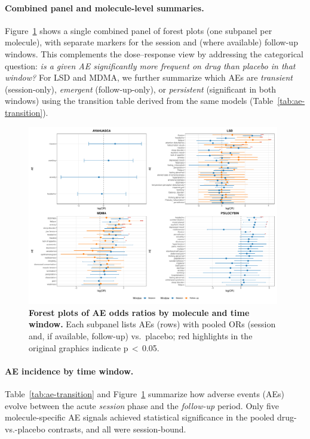 \paragraph{Combined panel and molecule-level summaries.}
Figure~\ref{fig:forest-combined} shows a single combined panel of forest plots (one subpanel per molecule), with separate markers for the session and (where available) follow-up windows. This complements the dose–response view by addressing the categorical question: \emph{is a given AE significantly more frequent on drug than placebo in that window?} For LSD and MDMA, we further summarize which AEs are \emph{transient} (session-only), \emph{emergent} (follow-up-only), or \emph{persistent} (significant in both windows) using the transition table derived from the same models (Table~\ref{tab:ae-transition}).

\begin{figure}[htb]
  \centering
  \includegraphics[width=0.98\textwidth]{figures/forest_combined_all_molecules.pdf}
  \caption{\textbf{Forest plots of AE odds ratios by molecule and time window.}
  Each subpanel lists AEs (rows) with pooled ORs (session and, if available, follow-up) vs.\ placebo; red highlights in the original graphics indicate p\,$<\,$0.05.}
  \label{fig:forest-combined}
\end{figure}




\paragraph{AE incidence by time window.}
Table~\ref{tab:ae-transition} and Figure~\ref{fig:forest-combined} summarize how adverse events (AEs) evolve between the acute \textit{session} phase and the \textit{follow-up} period.
Only five molecule-specific AE signals achieved statistical significance in the pooled drug-vs.-placebo contrasts, and all were session-bound.

